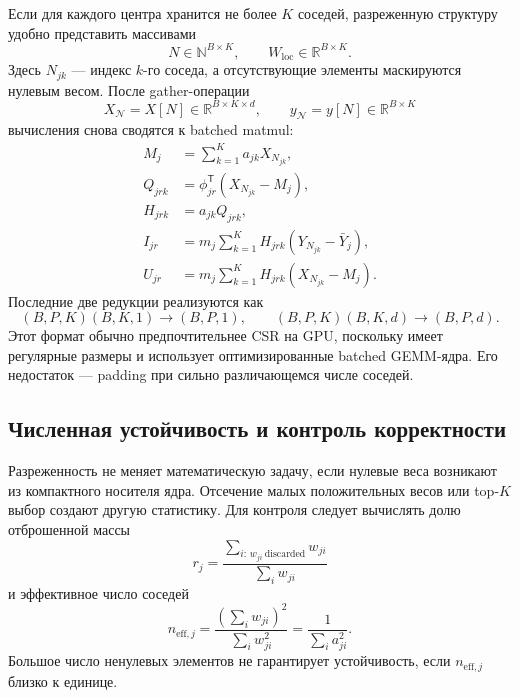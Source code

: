 Если для каждого центра хранится не более $K$ соседей, разреженную структуру
удобно представить массивами
\[
N\in\mathbb N^{B\times K},
\qquad
W_{\mathrm{loc}}\in\mathbb R^{B\times K}.
\]
Здесь $N_{jk}$ --- индекс $k$-го соседа, а отсутствующие элементы маскируются
нулевым весом. После gather-операции
\[
X_{\mathcal N}=X[N]\in\mathbb R^{B\times K\times d},
\qquad
y_{\mathcal N}=y[N]\in\mathbb R^{B\times K}
\]
вычисления снова сводятся к batched matmul:
\begin{align}
M_j&=\sum_{k=1}^K a_{jk}X_{N_{jk}},
\\
Q_{jrk}&=\phi_{jr}^{\mathsf T}(X_{N_{jk}}-M_j),
\\
H_{jrk}&=a_{jk}Q_{jrk},
\\
I_{jr}&=m_j\sum_{k=1}^KH_{jrk}(Y_{N_{jk}}-\bar Y_j),
\\
U_{jr}&=m_j\sum_{k=1}^KH_{jrk}(X_{N_{jk}}-M_j).
\end{align}
Последние две редукции реализуются как
\[
(B,P,K)(B,K,1)\longrightarrow(B,P,1),
\qquad
(B,P,K)(B,K,d)\longrightarrow(B,P,d).
\]
Этот формат обычно предпочтительнее CSR на GPU, поскольку имеет регулярные размеры
и использует оптимизированные batched GEMM-ядра. Его недостаток --- padding при сильно
различающемся числе соседей.

\subsection{Численная устойчивость и контроль корректности}

Разреженность не меняет математическую задачу, если нулевые веса возникают из
компактного носителя ядра. Отсечение малых положительных весов или top-$K$ выбор
создают другую статистику. Для контроля следует вычислять долю отброшенной массы
\[
r_j=
\frac{\sum_{i:\,w_{ji}\ \mathrm{discarded}}w_{ji}}
     {\sum_iw_{ji}}
\]
и эффективное число соседей
\begin{equation}
n_{\mathrm{eff},j}
=
\frac{\left(\sum_iw_{ji}\right)^2}{\sum_iw_{ji}^2}
=
\frac{1}{\sum_i a_{ji}^2}.
\label{eq:adp-neff}
\end{equation}
Большое число ненулевых элементов не гарантирует устойчивость, если
$n_{\mathrm{eff},j}$ близко к единице.

